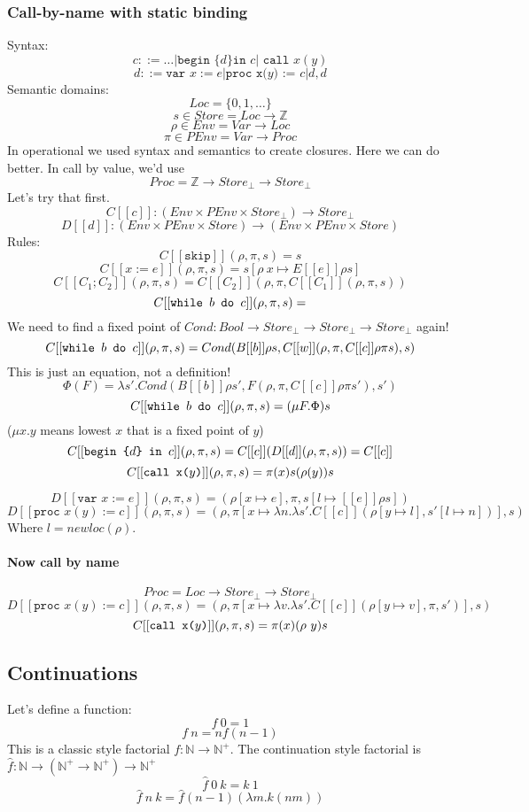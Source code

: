 \documentclass{article}
\begin{document}
\subsubsection{Call-by-name with static binding}
Syntax:
$$c::=\dots | \texttt{begin \{$d$\} in } c |\texttt{ call }x(y)$$
$$d::=\texttt{var }x:=e|\texttt{proc x($y$) := }c | d,d$$
Semantic domains:
$$Loc=\{0,1,\dots\}$$
$$s\in Store = Loc \rightarrow \mathbb{Z}$$
$$\rho\in Env = Var \rightarrow Loc$$
$$\pi\in PEnv = Var \rightarrow Proc$$
In operational we used syntax and semantics to create closures. Here we can do better.
In call by value, we'd use
$$Proc = \mathbb{Z} \rightarrow Store_\bot \rightarrow Store_\bot$$
Let's try that first.
$$C[[c]]:(Env\times PEnv \times Store_\bot) \rightarrow Store_\bot$$
$$D[[d]]:(Env\times PEnv \times Store) \rightarrow (Env\times PEnv \times Store)$$
Rules:
$$C[[\texttt{skip}]](\rho, \pi, s)=s$$
$$C[[x:=e]](\rho, \pi, s)=s[\rho\ x\mapsto E[[e]]\rho s]$$
$$C[[C_1;C_2]](\rho, \pi, s)=C[[C_2]](\rho, \pi, C[[C_1]](\rho,\pi, s))$$
$$C[[\texttt{while $ b $ do $ c $}]](\rho, \pi, s)=$$
We need to find a fixed point of $ Cond:Bool \rightarrow Store_\bot \rightarrow Store_\bot \rightarrow Store_\bot $ again!
$$C[[\texttt{while $ b $ do $ c $}]](\rho, \pi, s)=Cond(B[[b]]\rho s,C[[w]](\rho, \pi, C[[c]]\rho\pi s), s)$$
This is just an equation, not a definition!
$$\Phi(F)=\lambda s'.Cond(B[[b]]\rho s',F(\rho, \pi, C[[c]]\rho\pi s'), s')$$
$$C[[\texttt{while $ b $ do $ c $}]](\rho, \pi, s)=(\mu F.\Phi)s$$
($ \mu x.y $ means lowest $x$ that is a fixed point of $y$)
$$C[[\texttt{begin \{$ d $\} in } c]](\rho, \pi, s)=C[[c]](D[[d]](\rho, \pi, s))=C[[c]]$$
$$C[[\texttt{call x($ y $)}]](\rho, \pi, s)=\pi(x)s(\rho(y))s$$

$$D[[\texttt{var }x:=e]](\rho, \pi, s)=(\rho[x\mapsto e],\pi,s[l\mapsto[[e]]\rho s])$$
$$D[[\texttt{proc }x(y):=c]](\rho, \pi,s)=(\rho, \pi[x\mapsto \lambda n.\lambda s'.C[[c]](\rho[y\mapsto l], s'[l\mapsto n])], s)$$
Where  $l=newloc(\rho)$.

\paragraph{Now call by name}
$$Proc = Loc \rightarrow Store_\bot \rightarrow Store_\bot$$
$$D[[\texttt{proc }x(y):=c]](\rho, \pi,s)=(\rho, \pi[x\mapsto \lambda v.\lambda s'.C[[c]](\rho[y\mapsto v], \pi,s')], s)$$
$$C[[\texttt{call x($ y $)}]](\rho, \pi, s)=\pi(x)(\rho\ y)s$$

\subsection{Continuations}
Let's define a function:
$$f\ 0 = 1$$
$$f\ n=nf(n-1)$$
This is a classic style factorial $ f:\mathbb{N} \rightarrow \mathbb{N^+}$.
The continuation style factorial is $ \hat{f}:\mathbb{N} \rightarrow (\mathbb{N^+} \rightarrow \mathbb{N^+}) \rightarrow \mathbb{N^+} $
$$\hat{f}\ 0\ k = k\ 1$$
$$\hat{f}\ n\ k = \hat{f} (n - 1)(\lambda m.k(nm))$$
\end{document}
